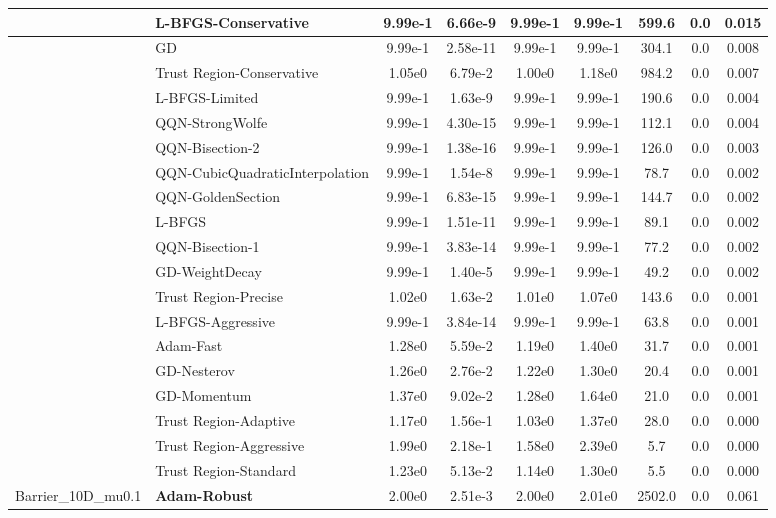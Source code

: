 \documentclass{article}
\begin{document}
\begin{longtable}{|l|l|c|c|c|c|c|c|c|}
\hline
 & L-BFGS-Conservative & 9.99e-1 & 6.66e-9 & 9.99e-1 & 9.99e-1 & 599.6 & 0.0 & 0.015 \\
\hline
 & GD & 9.99e-1 & 2.58e-11 & 9.99e-1 & 9.99e-1 & 304.1 & 0.0 & 0.008 \\
\hline
 & Trust Region-Conservative & 1.05e0 & 6.79e-2 & 1.00e0 & 1.18e0 & 984.2 & 0.0 & 0.007 \\
\hline
 & L-BFGS-Limited & 9.99e-1 & 1.63e-9 & 9.99e-1 & 9.99e-1 & 190.6 & 0.0 & 0.004 \\
\hline
 & QQN-StrongWolfe & 9.99e-1 & 4.30e-15 & 9.99e-1 & 9.99e-1 & 112.1 & 0.0 & 0.004 \\
\hline
 & QQN-Bisection-2 & 9.99e-1 & 1.38e-16 & 9.99e-1 & 9.99e-1 & 126.0 & 0.0 & 0.003 \\
\hline
 & QQN-CubicQuadraticInterpolation & 9.99e-1 & 1.54e-8 & 9.99e-1 & 9.99e-1 & 78.7 & 0.0 & 0.002 \\
\hline
 & QQN-GoldenSection & 9.99e-1 & 6.83e-15 & 9.99e-1 & 9.99e-1 & 144.7 & 0.0 & 0.002 \\
\hline
 & L-BFGS & 9.99e-1 & 1.51e-11 & 9.99e-1 & 9.99e-1 & 89.1 & 0.0 & 0.002 \\
\hline
 & QQN-Bisection-1 & 9.99e-1 & 3.83e-14 & 9.99e-1 & 9.99e-1 & 77.2 & 0.0 & 0.002 \\
\hline
 & GD-WeightDecay & 9.99e-1 & 1.40e-5 & 9.99e-1 & 9.99e-1 & 49.2 & 0.0 & 0.002 \\
\hline
 & Trust Region-Precise & 1.02e0 & 1.63e-2 & 1.01e0 & 1.07e0 & 143.6 & 0.0 & 0.001 \\
\hline
 & L-BFGS-Aggressive & 9.99e-1 & 3.84e-14 & 9.99e-1 & 9.99e-1 & 63.8 & 0.0 & 0.001 \\
\hline
 & Adam-Fast & 1.28e0 & 5.59e-2 & 1.19e0 & 1.40e0 & 31.7 & 0.0 & 0.001 \\
\hline
 & GD-Nesterov & 1.26e0 & 2.76e-2 & 1.22e0 & 1.30e0 & 20.4 & 0.0 & 0.001 \\
\hline
 & GD-Momentum & 1.37e0 & 9.02e-2 & 1.28e0 & 1.64e0 & 21.0 & 0.0 & 0.001 \\
\hline
 & Trust Region-Adaptive & 1.17e0 & 1.56e-1 & 1.03e0 & 1.37e0 & 28.0 & 0.0 & 0.000 \\
\hline
 & Trust Region-Aggressive & 1.99e0 & 2.18e-1 & 1.58e0 & 2.39e0 & 5.7 & 0.0 & 0.000 \\
\hline
 & Trust Region-Standard & 1.23e0 & 5.13e-2 & 1.14e0 & 1.30e0 & 5.5 & 0.0 & 0.000 \\
Barrier\_10D\_mu0.1 & \textbf{Adam-Robust} & 2.00e0 & 2.51e-3 & 2.00e0 & 2.01e0 & 2502.0 & 0.0 & 0.061 \\

\end{longtable}
\end{document}
